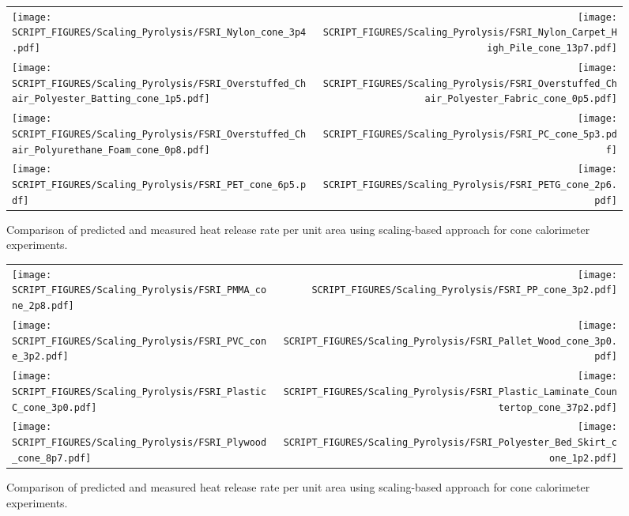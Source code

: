\begin{figure}[p]
\begin{tabular*}{\textwidth}{l@{\extracolsep{\fill}}r}
\texttt{[image: SCRIPT\_FIGURES/Scaling\_Pyrolysis/FSRI\_Nylon\_cone\_3p4.pdf]} &
\texttt{[image: SCRIPT\_FIGURES/Scaling\_Pyrolysis/FSRI\_Nylon\_Carpet\_High\_Pile\_cone\_13p7.pdf]} \\
\texttt{[image: SCRIPT\_FIGURES/Scaling\_Pyrolysis/FSRI\_Overstuffed\_Chair\_Polyester\_Batting\_cone\_1p5.pdf]} &
\texttt{[image: SCRIPT\_FIGURES/Scaling\_Pyrolysis/FSRI\_Overstuffed\_Chair\_Polyester\_Fabric\_cone\_0p5.pdf]} \\
\texttt{[image: SCRIPT\_FIGURES/Scaling\_Pyrolysis/FSRI\_Overstuffed\_Chair\_Polyurethane\_Foam\_cone\_0p8.pdf]} &
\texttt{[image: SCRIPT\_FIGURES/Scaling\_Pyrolysis/FSRI\_PC\_cone\_5p3.pdf]} \\
\texttt{[image: SCRIPT\_FIGURES/Scaling\_Pyrolysis/FSRI\_PET\_cone\_6p5.pdf]} &
\texttt{[image: SCRIPT\_FIGURES/Scaling\_Pyrolysis/FSRI\_PETG\_cone\_2p6.pdf]} \\
\end{tabular*}
\caption[HRRPUA of FSRI Materials using scaling model , Polymers materials]
{Comparison of predicted and measured heat release rate per unit area using scaling-based approach for cone calorimeter experiments.}
\label{FSRI_Materials_HRR_Polymers}
\end{figure}

\begin{figure}[p]
\begin{tabular*}{\textwidth}{l@{\extracolsep{\fill}}r}
\texttt{[image: SCRIPT\_FIGURES/Scaling\_Pyrolysis/FSRI\_PMMA\_cone\_2p8.pdf]} &
\texttt{[image: SCRIPT\_FIGURES/Scaling\_Pyrolysis/FSRI\_PP\_cone\_3p2.pdf]} \\
\texttt{[image: SCRIPT\_FIGURES/Scaling\_Pyrolysis/FSRI\_PVC\_cone\_3p2.pdf]} &
\texttt{[image: SCRIPT\_FIGURES/Scaling\_Pyrolysis/FSRI\_Pallet\_Wood\_cone\_3p0.pdf]} \\
\texttt{[image: SCRIPT\_FIGURES/Scaling\_Pyrolysis/FSRI\_PlasticC\_cone\_3p0.pdf]} &
\texttt{[image: SCRIPT\_FIGURES/Scaling\_Pyrolysis/FSRI\_Plastic\_Laminate\_Countertop\_cone\_37p2.pdf]} \\
\texttt{[image: SCRIPT\_FIGURES/Scaling\_Pyrolysis/FSRI\_Plywood\_cone\_8p7.pdf]} &
\texttt{[image: SCRIPT\_FIGURES/Scaling\_Pyrolysis/FSRI\_Polyester\_Bed\_Skirt\_cone\_1p2.pdf]} \\
\end{tabular*}
\caption[HRRPUA of FSRI Materials using scaling model , Polymers materials]
{Comparison of predicted and measured heat release rate per unit area using scaling-based approach for cone calorimeter experiments.}
\label{FSRI_Materials_HRR_Polymers}
\end{figure}

